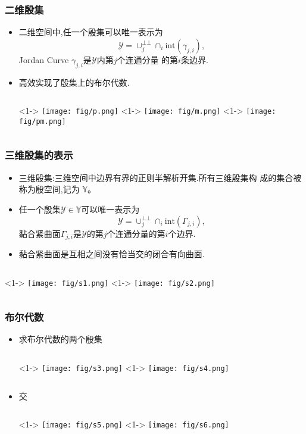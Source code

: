 \documentclass[UTF8]{ctexbeamer}	%
\theoremstyle{plain}
\theoremstyle{definition}
\theoremstyle{remark}
\numberwithin{equation}{section}
\begin{document}
\begin{frame}
    \frametitle{二维殷集}
    \begin{itemize}
        \item 二维空间中,任一个殷集可以唯一表示为
        \[\mathcal{Y} = \cup_j^{\bot \bot}\cap_i \text{int}(\gamma_{j, i} ),\]
        Jordan Curve $\gamma_{j, i}$是$\mathcal{Y}$内第$j$个连通分量
        的第$i$条边界.
        \item 高效实现了殷集上的布尔代数. 
        \begin{columns}
            <1->
                \texttt{[image: fig/p.png]}
            <1->
            \texttt{[image: fig/m.png]}
            <1->
            \texttt{[image: fig/pm.png]}
        \end{columns}
    \end{itemize}
\end{frame}

\begin{frame}
    \frametitle{三维殷集的表示}
    \begin{itemize}
        \item 三维殷集:三维空间中边界有界的正则半解析开集.所有三维殷集构
        成的集合被称为殷空间,记为 $\mathbb{Y}$。
        \item 任一个殷集$\mathcal{Y} \in \mathbb{Y}$可以唯一表示为
        \[\mathcal{Y} = \cup_j^{\bot \bot} \cap_i \text{int}(\Gamma_{j, i}),\]
        黏合紧曲面$\Gamma_{j, i}$是$\mathcal{Y}$的第$j$个连通分量的第$i$个边界.
        \item 黏合紧曲面是互相之间没有恰当交的闭合有向曲面.
    \end{itemize}
    \begin{columns}
        <1->
            \texttt{[image: fig/s1.png]}
        <1->
        \texttt{[image: fig/s2.png]}
    \end{columns}
\end{frame}

\begin{frame}
    \frametitle{布尔代数}
    \begin{itemize}
        \item 求布尔代数的两个殷集
        \begin{columns}
            <1->
                \texttt{[image: fig/s3.png]}
            <1->
            \texttt{[image: fig/s4.png]}
        \end{columns}
        \item 交
        \begin{columns}
            <1->
                \texttt{[image: fig/s5.png]}
            <1->
            \texttt{[image: fig/s6.png]}
        \end{columns}
    \end{itemize}
\end{frame}
\end{document}
